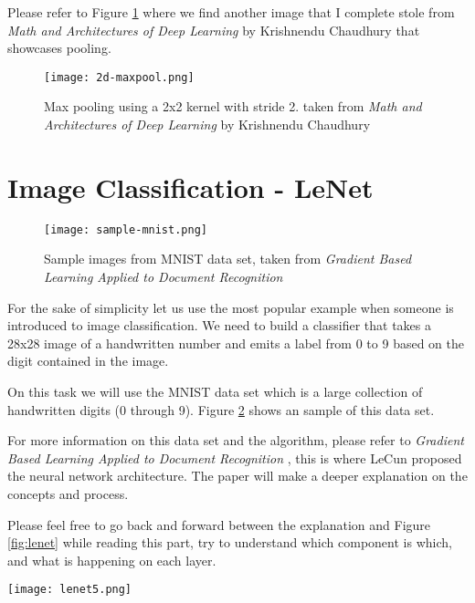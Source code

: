 \documentclass[10pt, twocolumn]{article}
\begin{document}
Please refer to Figure \ref{fig:maxpooling} where we find another image
that I complete stole from \emph{Math and Architectures of Deep Learning} by
Krishnendu Chaudhury that showcases pooling.

\begin{figure}[ht]
  \texttt{[image: 2d-maxpool.png]}
  \caption{Max pooling using a 2x2 kernel with stride 2. taken from \emph{Math
    and Architectures of Deep Learning} by Krishnendu Chaudhury}
  \label{fig:maxpooling}
\end{figure}


\section{Image Classification - LeNet}

\begin{figure}[ht]
  \texttt{[image: sample-mnist.png]}
  \caption{Sample images from MNIST data set, taken from \emph{Gradient Based
    Learning Applied to Document Recognition} \cite{mnist}}
  \label{fig:mnist}
\end{figure}

For the sake of simplicity let us use the most popular example when someone is
introduced to image classification. We need to build a classifier that takes a
28x28 image of a handwritten number and emits a label from 0 to 9 based on the
digit contained in the image.

On this task we will use the MNIST data set which is a large collection of
handwritten digits (0 through 9). Figure \ref{fig:mnist} shows an sample of
this data set.

For more information on this data set and the algorithm, please refer to
\emph{Gradient Based Learning Applied to Document Recognition} \cite{mnist},
this is where LeCun proposed the neural network architecture. The paper will
make a deeper explanation on the concepts and process.

Please feel free to go back and forward between the explanation and
Figure \ref{fig:lenet} while reading this part, try to understand which
component is which, and what is happening on each layer.

\begin{figure*}[ht]
  \centering
  \texttt{[image: lenet5.png]}
  \caption{LeNet Architecture, taken from \emph{Gradient Based
    Learning Applied to Document Recognition} \cite{mnist}}
  \label{fig:lenet}
\end{figure*}
\end{document}
